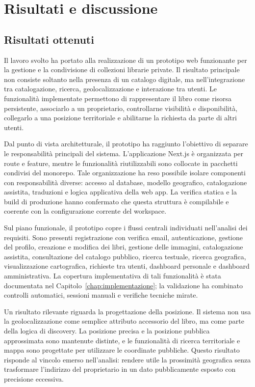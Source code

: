\chapter{Risultati e discussione}
\label{chap:risultati-discussione}

\section{Risultati ottenuti}
\label{sec:risultati-ottenuti}

Il lavoro svolto ha portato alla realizzazione di un prototipo web funzionante per la gestione e la condivisione di collezioni librarie private. Il risultato principale non consiste soltanto nella presenza di un catalogo digitale, ma nell'integrazione tra catalogazione, ricerca, geolocalizzazione e interazione tra utenti. Le funzionalità implementate permettono di rappresentare il libro come risorsa persistente, associarlo a un proprietario, controllarne visibilità e disponibilità, collegarlo a una posizione territoriale e abilitarne la richiesta da parte di altri utenti.

Dal punto di vista architetturale, il prototipo ha raggiunto l'obiettivo di separare le responsabilità principali del sistema. L'applicazione Next.js è organizzata per route e feature, mentre le funzionalità riutilizzabili sono collocate in pacchetti condivisi del monorepo. Tale organizzazione ha reso possibile isolare componenti con responsabilità diverse: accesso al database, modello geografico, catalogazione assistita, traduzioni e logica applicativa della web app. La verifica statica e la build di produzione hanno confermato che questa struttura è compilabile e coerente con la configurazione corrente del workspace.

Sul piano funzionale, il prototipo copre i flussi centrali individuati nell'analisi dei requisiti. Sono presenti registrazione con verifica email, autenticazione, gestione del profilo, creazione e modifica dei libri, gestione delle immagini, catalogazione assistita, consultazione del catalogo pubblico, ricerca testuale, ricerca geografica, visualizzazione cartografica, richieste tra utenti, dashboard personale e dashboard amministrativa. La copertura implementativa di tali funzionalità è stata documentata nel Capitolo~\ref{chap:implementazione}; la validazione ha combinato controlli automatici, sessioni manuali e verifiche tecniche mirate.

Un risultato rilevante riguarda la progettazione della posizione. Il sistema non usa la geolocalizzazione come semplice attributo accessorio del libro, ma come parte della logica di discovery. La posizione precisa e la posizione pubblica approssimata sono mantenute distinte, e le funzionalità di ricerca territoriale e mappa sono progettate per utilizzare le coordinate pubbliche. Questo risultato risponde al vincolo emerso nell'analisi: rendere utile la prossimità geografica senza trasformare l'indirizzo del proprietario in un dato pubblicamente esposto con precisione eccessiva.


